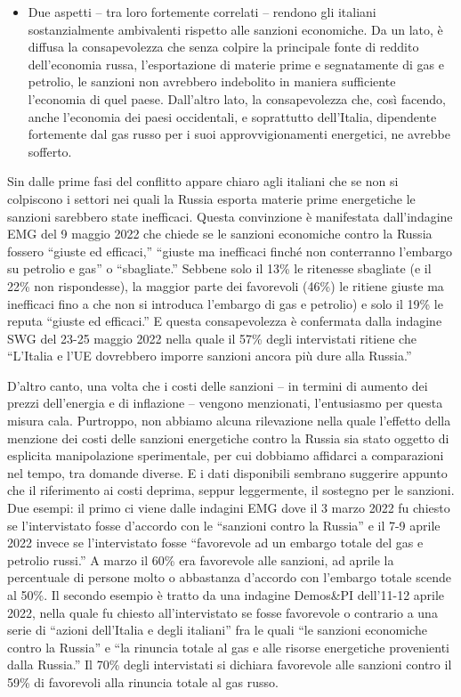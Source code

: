 \documentclass[
]{book}
\providecommand{\tightlist}{%
  \setlength{\itemsep}{0pt}\setlength{\parskip}{0pt}}
\begin{document}
\begin{itemize}
\tightlist
\item
  Due aspetti -- tra loro fortemente correlati -- rendono gli italiani sostanzialmente ambivalenti rispetto alle sanzioni economiche. Da un lato, è diffusa la consapevolezza che senza colpire la principale fonte di reddito dell'economia russa, l'esportazione di materie prime e segnatamente di gas e petrolio, le sanzioni non avrebbero indebolito in maniera sufficiente l'economia di quel paese. Dall'altro lato, la consapevolezza che, così facendo, anche l'economia dei paesi occidentali, e soprattutto dell'Italia, dipendente fortemente dal gas russo per i suoi approvvigionamenti energetici, ne avrebbe sofferto.
\end{itemize}

Sin dalle prime fasi del conflitto appare chiaro agli italiani che se non si colpiscono i settori nei quali la Russia esporta materie prime energetiche le sanzioni sarebbero state inefficaci. Questa convinzione è manifestata dall'indagine EMG del 9 maggio 2022 che chiede se le sanzioni economiche contro la Russia fossero ``giuste ed efficaci,'' ``giuste ma inefficaci finché non conterranno l'embargo su petrolio e gas'' o ``sbagliate.'' Sebbene solo il 13\% le ritenesse sbagliate (e il 22\% non rispondesse), la maggior parte dei favorevoli (46\%) le ritiene giuste ma inefficaci fino a che non si introduca l'embargo di gas e petrolio) e solo il 19\% le reputa ``giuste ed efficaci.'' E questa consapevolezza è confermata dalla indagine SWG del 23-25 maggio 2022 nella quale il 57\% degli intervistati ritiene che ``L'Italia e l'UE dovrebbero imporre sanzioni ancora più dure alla Russia.''

D'altro canto, una volta che i costi delle sanzioni -- in termini di aumento dei prezzi dell'energia e di inflazione -- vengono menzionati, l'entusiasmo per questa misura cala. Purtroppo, non abbiamo alcuna rilevazione nella quale l'effetto della menzione dei costi delle sanzioni energetiche contro la Russia sia stato oggetto di esplicita manipolazione sperimentale, per cui dobbiamo affidarci a comparazioni nel tempo, tra domande diverse. E i dati disponibili sembrano suggerire appunto che il riferimento ai costi deprima, seppur leggermente, il sostegno per le sanzioni. Due esempi: il primo ci viene dalle indagini EMG dove il 3 marzo 2022 fu chiesto se l'intervistato fosse d'accordo con le ``sanzioni contro la Russia'' e il 7-9 aprile 2022 invece se l'intervistato fosse ``favorevole ad un embargo totale del gas e petrolio russi.'' A marzo il 60\% era favorevole alle sanzioni, ad aprile la percentuale di persone molto o abbastanza d'accordo con l'embargo totale scende al 50\%. Il secondo esempio è tratto da una indagine Demos\&PI dell'11-12 aprile 2022, nella quale fu chiesto all'intervistato se fosse favorevole o contrario a una serie di ``azioni dell'Italia e degli italiani'' fra le quali ``le sanzioni economiche contro la Russia'' e ``la rinuncia totale al gas e alle risorse energetiche provenienti dalla Russia.'' Il 70\% degli intervistati si dichiara favorevole alle sanzioni contro il 59\% di favorevoli alla rinuncia totale al gas russo.
\end{document}
